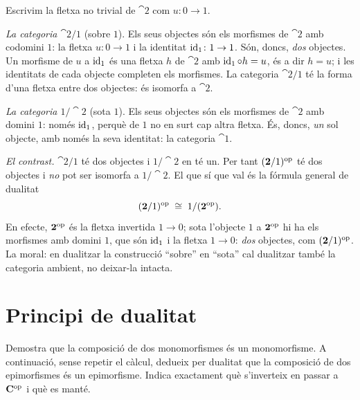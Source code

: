 \begin{solucio}
Escrivim la fletxa no trivial de $\cat{2}$ com $u\colon 0\to 1$.

\emph{La categoria $\cat{2}/1$} (sobre $1$). Els seus objectes són els morfismes de $\cat{2}$ amb codomini $1$: la fletxa $u\colon 0\to 1$ i la identitat $\operatorname{id}_1\colon 1\to 1$. Són, doncs, \emph{dos} objectes. Un morfisme de $u$ a $\operatorname{id}_1$ és una fletxa $h$ de $\cat{2}$ amb $\operatorname{id}_1\circ h=u$, és a dir $h=u$; i les identitats de cada objecte completen els morfismes. La categoria $\cat{2}/1$ té la forma d'una fletxa entre dos objectes: és isomorfa a $\cat{2}$.

\emph{La categoria $1/\cat{2}$} (sota $1$). Els seus objectes són els morfismes de $\cat{2}$ amb domini $1$: només $\operatorname{id}_1$, perquè de $1$ no en surt cap altra fletxa. És, doncs, \emph{un} sol objecte, amb només la seva identitat: la categoria $\cat{1}$.

\emph{El contrast.} $\cat{2}/1$ té dos objectes i $1/\cat{2}$ en té un. Per tant $(\mathbf{2}/1)^{\mathrm{op}}$ té dos objectes i \emph{no} pot ser isomorfa a $1/\cat{2}$. El que sí que val és la fórmula general de dualitat
\[
(\mathbf{2}/1)^{\mathrm{op}}\;\cong\;1/(\mathbf{2}^{\mathrm{op}}).
\]
En efecte, $\mathbf{2}^{\mathrm{op}}$ és la fletxa invertida $1\to 0$; sota l'objecte $1$ a $\mathbf{2}^{\mathrm{op}}$ hi ha els morfismes amb domini $1$, que són $\operatorname{id}_1$ i la fletxa $1\to 0$: \emph{dos} objectes, com $(\mathbf{2}/1)^{\mathrm{op}}$. La moral: en dualitzar la construcció \enquote{sobre} en \enquote{sota} cal dualitzar també la categoria ambient, no deixar-la intacta.
\end{solucio}

\section{Principi de dualitat}

\begin{exercici}\label{exr:pr-dual-mono-epi}
Demostra que la composició de dos monomorfismes és un monomorfisme. A continuació, sense repetir el càlcul, dedueix per dualitat que la composició de dos epimorfismes és un epimorfisme. Indica exactament què s'inverteix en passar a $\mathbf{C}^{\mathrm{op}}$ i què es manté.
\end{exercici}

